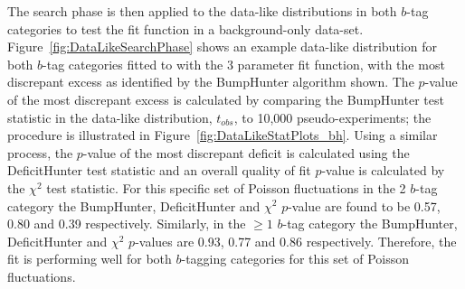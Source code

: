 The search phase is then applied to the data-like distributions
in both $b$-tag categories 
to test the fit function in a background-only data-set.
Figure~\ref{fig:DataLikeSearchPhase} shows an example data-like distribution for both $b$-tag categories fitted
to with the 3 parameter fit function,
with the most discrepant excess as identified by the BumpHunter algorithm shown.
The \mbox{$p$-value} of the most discrepant excess is calculated by comparing the BumpHunter test statistic in the data-like distribution, $t_{obs}$,
to 10,000 pseudo-experiments; the procedure is illustrated in Figure~\ref{fig:DataLikeStatPlots_bh}.
Using a similar process, the \mbox{$p$-value} of the most discrepant deficit is calculated using the DeficitHunter test statistic
and an overall quality of fit \mbox{$p$-value} is calculated by the $\chi^{2}$ test statistic.
For this specific set of Poisson fluctuations in the 2 $b$-tag category
the BumpHunter, DeficitHunter and  $\chi^{2}$ \mbox{$p$-value} are found to be
0.57, 0.80 and 0.39 respectively.
Similarly, in the $\geq1$ $b$-tag category the
BumpHunter, DeficitHunter and  $\chi^{2}$ \mbox{$p$-value}s are
0.93, 0.77 and 0.86 respectively.
Therefore, the fit is performing well for both $b$-tagging categories for this set of Poisson fluctuations.\\

